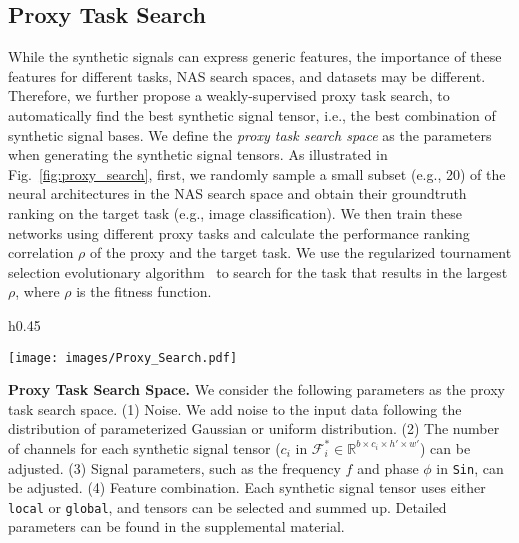 \documentclass{article}
\begin{document}
\vspace{-8pt}
\subsection{Proxy Task Search} 
\label{sec:task_search}
\vspace{-4pt}

While the synthetic signals can express generic features, the importance of these features for different tasks, NAS search spaces, and datasets may be different.
Therefore, we further propose a weakly-supervised proxy task search, to automatically find the best synthetic signal tensor, i.e., the best combination of synthetic signal bases.
We define the \textit{proxy task search space} as the parameters when generating the synthetic signal tensors.
As illustrated in Fig.~\ref{fig:proxy_search}, first, we randomly sample a small subset (e.g., 20) of the neural architectures in the NAS search space and obtain their groundtruth ranking on the target task (e.g., image classification).
We then train these networks using different proxy tasks and calculate the performance ranking correlation $\rho$ of the proxy and the target task.
We use the regularized tournament selection evolutionary algorithm~\cite{real2019regularized} to search for the task that results in the largest $\rho$, where $\rho$ is the fitness function.

\begin{wrapfigure}{h}{0.45\textwidth}
\vspace{-16pt}
  \begin{center}
    \texttt{[image: images/Proxy\_Search.pdf]}
  \end{center}
  \caption{Proxy task search.}
  \label{fig:proxy_search}
  \vspace{-16pt}
\end{wrapfigure}



\textbf{Proxy Task Search Space.} 
We consider the following parameters as the proxy task search space.
(1) Noise.
We add noise to the input data following the distribution of parameterized Gaussian or uniform distribution.
(2) The number of channels for each synthetic signal tensor ($c_i$ in $\mathcal{F}_i^{*} \in \mathbb{R}^{b \times c_i \times h' \times w'}$) can be adjusted. 
(3) Signal parameters, such as the frequency $f$ and phase $\phi$ in \texttt{Sin}, can be adjusted.
(4) Feature combination.
Each synthetic signal tensor uses either \texttt{local} or \texttt{global}, and tensors can be selected and summed up.
Detailed parameters can be found in the supplemental material.
\end{document}

